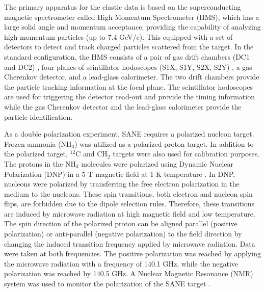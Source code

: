 \documentclass[12pt]{article}
\begin{document}
The primary apparatus for the elastic data is based on the superconducting magnetic spectrometer called High Momentum Spectrometer (HMS), which has a large solid angle and momentum acceptance, providing the capability of analyzing high momentum particles (up to 7.4 GeV/c). This equipped with a set of detectors to detect and track charged particles scattered from the target. In the standard configuration, the HMS consists of a pair of gas drift chambers (DC1 and DC2) \cite{107}, four planes of scintillator hodoscopes (S1X, S1Y, S2X, S2Y) \cite{108}, a gas Cherenkov detector, and a lead-glass calorimeter. The two drift chambers provide the particle tracking information at the focal plane. The scintillator hodoscopes are used for triggering the detector read-out and provide the timing information while the gas Cherenkov detector and the lead-glass calorimeter provide the particle identification. 

As a double polarization experiment, SANE requires a polarized nucleon target. Frozen ammonia (NH${_3}$) was utilized as a polarized proton target. In addition to the polarized target, $^{12}$C and CH$_2$ targets were also used for calibration purposes. The protons in the NH$_3$ molecules were polarized using Dynamic Nuclear Polarization (DNP) in a 5 T magnetic field at 1 K temperature \cite{136}. In DNP, nucleons were polarized by transferring the free electron polarization in the medium to the nucleons. These spin transitions, both electron and nucleon spin flips, are forbidden due to the dipole selection rules. Therefore, these transitions are induced by microwave radiation at high magnetic field and low temperature. 
The spin direction of the polarized proton can be aligned parallel (positive polarization) or anti-parallel (negative polarization) to the field direction by changing the induced transition frequency applied by microwave radiation. Data were taken at both frequencies. 
The positive polarization was reached by applying the microwave radiation with a frequency of 140.1 GHz, while the negative polarization was reached by 140.5 GHz. A Nuclear Magnetic Resonance (NMR) system was used to monitor the polarization of the SANE target \cite{109}.
\end{document}
